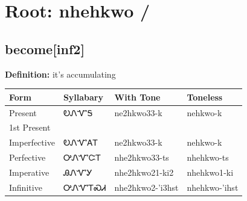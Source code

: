 \documentclass{article}%
\begin{document}
%
\normalsize%
\section*{Root: nhehkwo / }%
\subsection*{become[inf2]}%
\textbf{Definition: }%
it’s accumulating%
\\[0.5em]%
\begin{tabular}{|l|l|l|l|}%
\hline%
\textbf{Form}&\textbf{Syllabary}&\textbf{With Tone}&\textbf{Toneless}\\%
\hline%
Present&ᎧᏁᏉᎦ&ne2hkwo33{-}k&nehkwo{-}k\\%
1st Present&&&\\%
Imperfective&ᎧᏁᏉᎪᎢ&ne2hkwo33{-}k&nehkwo{-}k\\%
Perfective&ᎤᏁᏉᏨᎢ&nhe2hkwo33{-}ts&nhehkwo{-}ts\\%
Imperative&ᎯᏁᏉᎩ&nhe2hkwo21{-}ki2&nhehkwo1{-}ki\\%
Infinitive&ᎤᏁᏉᎢᏍᏗ&nhe2hkwo2{-}'i3hst&nhehkwo{-}'ihst\\%
\hline%
\end{tabular}%
\\[1em]%
\end{document}
